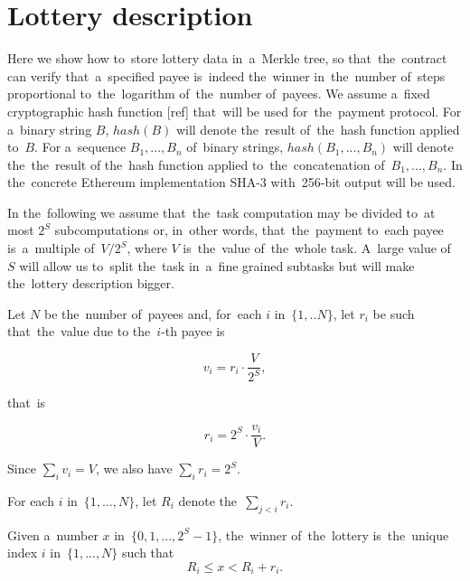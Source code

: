 \documentclass[a4paper]{article}
\begin{document}
\section{Lottery description}
\label{sec:lottery-description}
    Here we show how to~store lottery data in~a~Merkle tree, so that~the~contract can verify that~a~specified payee
    is~indeed the~winner in~the~number of~steps proportional to~the~logarithm of~the~number of~payees.
    We assume a~fixed cryptographic hash function [ref] that~will be used for~the~payment protocol.
    For a~binary string $B$, $hash(B)$ will denote the~result of~the~hash function applied to~$B$.
    For a~sequence $B_1, ..., B_n$ of~binary strings, $hash(B_1, ..., B_n)$ will denote the~the~result of
    the~hash function applied to~the~concatenation of~$B_1, ..., B_n$. In the~concrete Ethereum implementation SHA-3
    with~256-bit output will be used.

    In the~following we assume that~the~task computation may be divided to~at most $2^S$ subcomputations or,
    in~other words, that~the~payment to~each payee is~a~multiple of~$V/2^S$, where $V$ is~the~value of~the~whole task.
    A~large value of~$S$ will allow us to~split the~task in~a~fine grained subtasks but will make the~lottery
    description bigger.

    Let $N$ be the~number of~payees and, for~each $i$ in~$\{1, .. N\}$, let $r_i$ be such that~the~value due to
    the~$i$-th payee is

    \begin{displaymath}
        v_i = r_i \cdot \frac{V}{2^S},
    \end{displaymath}

    that~is

    \begin{displaymath}
        r_i = 2^S \cdot \frac{v_i}{V}.
    \end{displaymath}

    Since $\sum_i v_i = V$, we also have $\sum_i r_i = 2^S$.

    For each $i$ in~$\{1, ..., N\}$, let $R_i$ denote the~$\sum_{j<i} r_i$.

    Given a~number $x$ in~$\{0, 1 ,... ,2^S-1\}$, the~winner of~the~lottery is~the~unique index $i$ in~$\{1, ..., N\}$
    such that
    \begin{displaymath}
        R_i \leq x < R_i+r_i.
    \end{displaymath}
\end{document}
